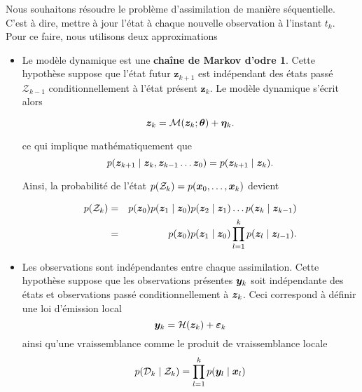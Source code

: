 Nous souhaitons résoudre le problème d'assimilation de manière séquentielle. C'est à dire, mettre à jour l'état à chaque nouvelle observation à l'instant $t_k$. Pour ce faire, nous utilisons deux approximations

\begin{itemize}
    \item Le modèle dynamique est une \textbf{chaîne de Markov d'odre 1}. Cette hypothèse suppose que l'état futur $\bm z_{k+1}$ est indépendant des états passé $\mathcal Z_{k-1}$ conditionnellement à l'état présent $\bm z_{k}$. Le modèle dynamique s'écrit alors

          \begin{equation*}
              \bm z_k = \mathcal{M}(\bm z_k ; \bm \theta) + \bm \eta_k.
          \end{equation*}

          ce qui implique mathématiquement que
          \begin{equation*}
              p(\bz_{k+1} \mid \bz_{k},\bz_{k-1}\dots \bz_{0}) = p(\bz_{k+1} \mid \bz_{k}).
          \end{equation*}

          Ainsi, la probabilité de l'état $p(\mathcal{Z}_k)=p(\bm{x}_0, \dots, \bm{x}_k)$ devient

          \begin{eqnarray*}
              p(\mathcal{Z}_k) &=& p(\bm z_0) p(\bm z_1 \mid \bm z_0) p(\bm z_2 \mid \bm z_1) \dots p(\bm z_k \mid \bm z_{k-1}) \\
              &=& p(\bm z_0) p(\bm z_1 \mid \bm z_0) \prod_{l = 1}^{k} p(\bm z_l \mid \bm z_{l-1}).
          \end{eqnarray*}

    \item Les observations sont indépendantes entre chaque assimilation. Cette hypothèse suppose que les observations présentes $\bm{y}_k$ soit indépendante des états et observations passé conditionnellement à $\bm z_k$. Ceci correspond à définir une loi d'émission local
          \begin{equation*}
              \bm{y}_k = \mathcal H (\bm z_k) + \bm{\varepsilon}_k
          \end{equation*}
          ainsi qu'une vraissemblance comme le produit de vraissemblance locale
          \begin{equation*}
              p(\mathcal{D}_k \mid \mathcal Z_k) = \prod_{l=1}^{k} p(\bm{y}_l \mid \bm{x}_l)
          \end{equation*}
\end{itemize}


